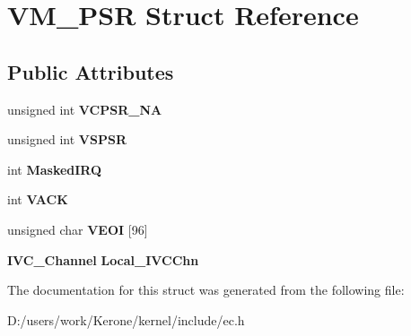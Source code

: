 \section{V\+M\+\_\+\+P\+SR Struct Reference}
\label{struct_v_m___p_s_r}
\subsection*{Public Attributes}
\begin{DoxyCompactItemize}
\item 
\mbox{\label{struct_v_m___p_s_r_ade4303149135be99d94f7e3d56ce5cbf}} 
unsigned int {\bfseries V\+C\+P\+S\+R\+\_\+\+NA}
\item 
\mbox{\label{struct_v_m___p_s_r_a53139ce0578c53182a2c8edba2e64d2b}} 
unsigned int {\bfseries V\+S\+P\+SR}
\item 
\mbox{\label{struct_v_m___p_s_r_ac47c7d602628f24cdcbfc9b19fc781f4}} 
int {\bfseries Masked\+I\+RQ}
\item 
\mbox{\label{struct_v_m___p_s_r_a80b75a095db2ce74350eccc64a77d3ce}} 
int {\bfseries V\+A\+CK}
\item 
\mbox{\label{struct_v_m___p_s_r_a41183763a43d82860a55e7f0f32cd626}} 
unsigned char {\bfseries V\+E\+OI} [96]
\item 
\mbox{\label{struct_v_m___p_s_r_ad97a7d57037d23075fb899752894508b}} 
\textbf{ I\+V\+C\+\_\+\+Channel} {\bfseries Local\+\_\+\+I\+V\+C\+Chn}
\end{DoxyCompactItemize}


The documentation for this struct was generated from the following file\+:\begin{DoxyCompactItemize}
\item 
D\+:/users/work/\+Kerone/kernel/include/ec.\+h\end{DoxyCompactItemize}
